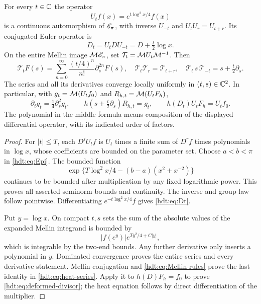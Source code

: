 \begin{hdttheorem}\label{hdt:thm:transport}
For every $t\in\mathbb C$ the operator
\begin{equation}\label{hdt:eq:Ut}
U_tf(x)=e^{t\log^2x/4}f(x)
\end{equation}
is a continuous automorphism of $\mathscr E_\pi$, with inverse $U_{-t}$ and
$U_tU_r=U_{t+r}$. Its conjugated Euler operator is
\begin{equation}\label{hdt:eq:Dt}
D_t=U_tDU_{-t}=D+\tfrac t2\log x.
\end{equation}
On the entire Mellin image $\mathcal M\mathscr E_\pi$, set
$\mathcal T_t=\mathcal M U_t\mathcal M^{-1}$. Then
\begin{equation}\label{hdt:eq:heat-series}
\mathcal T_tF(s)
=\sum_{n=0}^{\infty}\frac{(t/4)^n}{n!}\partial_s^{2n}F(s),
\quad \mathcal T_t\mathcal T_r=\mathcal T_{t+r},\quad
\mathcal T_t\,s\,\mathcal T_{-t}=s+\tfrac t2\partial_s.
\end{equation}
The series and all its derivatives converge locally uniformly in
$(t,s)\in\mathbb C^2$. In particular, with $g_t=\mathcal M(U_tf_0)$ and
$R_{h,t}=\mathcal M(U_tF_h)$,
\begin{equation}\label{hdt:eq:deformed-divisor}
\partial_tg_t=\tfrac14\partial_s^2g_t,\qquad
h\left(s+\tfrac t2\partial_s\right)R_{h,t}=g_t,
\qquad h(D_t)U_tF_h=U_tf_0.
\end{equation}
The polynomial in the middle formula means composition of the
displayed differential operator, with its indicated order of factors.
\end{hdttheorem}
\begin{proof}
For $|t|\leq T$, each $D^jU_tf$ is $U_t$ times a finite sum of
$D^rf$ times polynomials in $\log x$, whose coefficients are bounded
on the parameter set. Choose $a<b<\pi$ in \eqref{hdt:eq:Epi}.
The bounded function
\[
\exp\{T\log^2x/4-(b-a)(x^2+x^{-2})\}
\]
continues to be bounded after multiplication by any fixed
logarithmic power. This proves all asserted seminorm bounds and
continuity. The inverse and group law follow pointwise.
Differentiating $e^{-t\log^2x/4}f$ gives \eqref{hdt:eq:Dt}.

Put $y=\log x$. On compact $t,s$ sets the sum of the absolute
values of the expanded Mellin integrand is bounded by
\[
|f(e^y)|e^{T y^2/4+C|y|},
\]
which is integrable by the two-end bounds. Any further derivative
only inserts a polynomial in $y$. Dominated convergence proves the
entire series and every derivative statement. Mellin conjugation
and \eqref{hdt:eq:Mellin-rules} prove the last identity in
\eqref{hdt:eq:heat-series}. Apply it to $h(D)F_h=f_0$ to prove
\eqref{hdt:eq:deformed-divisor}; the heat equation follows by direct
differentiation of the multiplier.
\end{proof}

